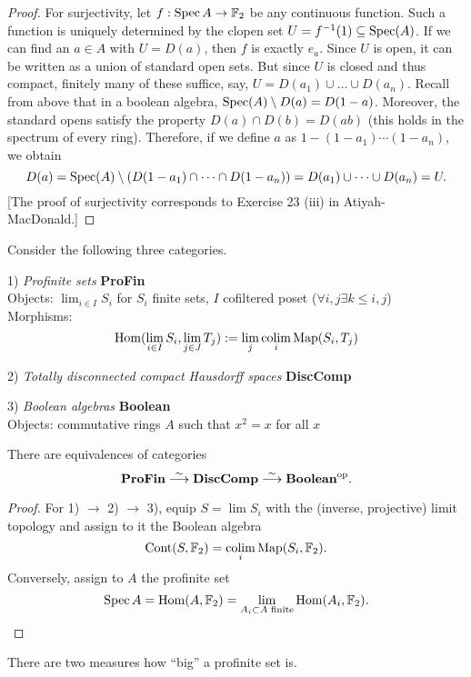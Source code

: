 \documentclass{notes}
\begin{document}
{\begin{proof}
  For surjectivity, let \(f:\operatorname{Spec} A \to {\mathbb{F}}_2\) be any continuous function.
  Such a function is uniquely determined by the clopen set \(U=f^{-1}(1)\subseteq\operatorname{Spec}(A)\).
  If we can find an \(a\in A\) with \(U=D(a)\), then \(f\) is exactly \(e_a\).
  Since \(U\) is open, it can be written as a union of standard open sets.
  But since \(U\) is closed and thus compact, finitely many of these suffice, say, \(U=D(a_1)\cup\dots\cup D(a_n)\).
  Recall from above that in a boolean algebra, \(\operatorname{Spec}(A)\setminus D(a)=D(1-a)\).
  Moreover, the standard opens satisfy the property \(D(a)\cap D(b)=D(ab)\) (this holds in the spectrum of every ring).
  Therefore, if we define \(a\) as \(1-(1-a_1)\cdots (1-a_n)\), we obtain
  \[
    D(a) = \operatorname{Spec}(A)\setminus (D(1-a_1)\cap\dots\cap D(1-a_n)) = D(a_1)\cup\dots\cup D(a_n) = U.
  \]
  [The proof of surjectivity corresponds to Exercise 23 (iii) in Atiyah-MacDonald.]
\end{proof}
}

Consider the following three categories.

1) {\em Profinite sets} {\bf ProFin} \\
Objects: $\lim_{i\in I}S_i$ for $S_i$ finite sets, $I$ cofiltered poset
($\forall i,j \exists k\leq i,j$)
\\
Morphisms: 
$$
  \mathrm{Hom}(\lim_{i\in I}S_i,\lim_{j\in J}T_j) := \lim_j\operatorname*{colim}_i{\rm Map}(S_i,T_j)
$$

2) {\em Totally disconnected compact Hausdorff spaces} {\bf DiscComp}

3) {\em Boolean algebras} {\bf Boolean} \\ 
Objects: commutative rings $A$ such that $x^2=x$ for all $x$ 

\begin{prop}
There are equivalences of categories
$$
  \textbf{ProFin} \stackrel{\sim}\longrightarrow 
  \textbf{DiscComp} \stackrel{\sim}\longrightarrow  
  \textbf{Boolean}^{\rm op}.
$$
\end{prop}

\begin{proof}
For 1) $\to$ 2) $\to$ 3), equip $S=\lim S_i$ with the (inverse,
projective) limit topology and assign to it the Boolean algebra
$$
   {\rm Cont}(S,{\mathbb{F}}_2) = \operatorname*{colim}_i{\rm Map}(S_i,{\mathbb{F}}_2).
$$
Conversely, assign to $A$ the profinite set
$$
  \operatorname{Spec} A = \mathrm{Hom}(A,{\mathbb{F}}_2) = \lim_{A_i\subset A\text{ finite}}\mathrm{Hom}(A_i,{\mathbb{F}}_2).
$$
\end{proof}

There are two measures how ``big'' a profinite set is.
\end{document}
